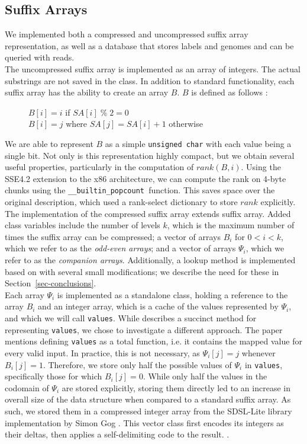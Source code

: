 \documentclass{article}
\newcommand{\popcnt}{\texttt{\_\_builtin\_popcount }}
\begin{document}
\subsection{Suffix Arrays}
\label{subsec-sa}
We implemented both a compressed and uncompressed suffix array representation, as well as a database that stores labels and genomes and can be queried with reads.\\
\indent The uncompressed suffix array is implemented as an array of integers. The actual substrings are not saved in the class. In addition to standard functionality, each suffix array has the ability to create an array $B$. $B$ is defined as follows \cite{GV05}:
\begin{figure}[H]
\label{fig-defn-b}
$B[i] = i$ if $SA[i]\;\%\; 2 = 0$\\
$B[i] = j$ where $SA[j] = SA[i]+1$ otherwise
\end{figure}
\indent We are able to represent $B$ as a simple \texttt{unsigned char\*} with each value being a single bit. Not only is this representation highly compact, but we obtain several useful properties, particularly in the computation of $rank(B,i)$. Using the SSE4.2 extension to the x86 architecture, we can compute the rank on 4-byte chunks using the \popcnt function. This saves space over the original description, which used a rank-select dictionary to store $rank$ explicitly.\\
\indent The implementation of the compressed suffix array extends suffix array. Added class variables include the number of levels $k$, which is the maximum number of times the suffix array can be compressed; a vector of arrays $B_i$ for $0 < i < k$, which we refer to as the \emph{odd-even arrays}; and a vector of arrays $\Psi_i$, which we refer to as the \emph{companion arrays}. Additionally, a lookup method is implemented based on \cite{GV05} with several small modifications; we describe the need for these in Section~\ref{sec-conclusions}.\\
\indent Each array $\Psi_i$ is implemented as a standalone class, holding a reference to the array $B_i$ and an integer array, which is a cache of the values represented by $\Psi_i$, and which we will call \texttt{values}. While \cite{GV05} describes a succinct method for representing \texttt{values}, we chose to investigate a different approach. The paper mentions defining \texttt{values} as a total function, i.e. it contains the mapped value for every valid input. In practice, this is not necessary, as $\Psi_i[j] = j$ whenever $B_i[j] = 1$. Therefore, we store only half the possible values of $\Psi_i$ in \texttt{values}, specifically those for which $B_i[j] = 0$. While only half the values in the codomain of $\Psi_i$ are stored explicitly, storing them directly led to an increase in overall size of the data structure when compared to a standard suffix array. As such, we stored them in a compressed integer array from the SDSL-Lite library implementation by Simon Gog \cite{SDSL}. This vector class first encodes its integers as their deltas, then applies a self-delimiting code to the result. \cite{OS07}.\\
\end{document}
